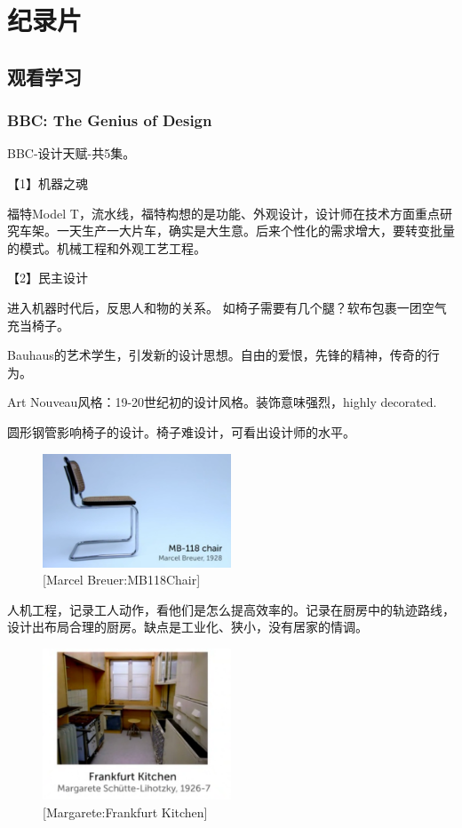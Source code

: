 \documentclass[UTF8]{../RepresentationUniverse}
\begin{document}
\section{纪录片}

\subsection{观看学习}


\subsubsection{BBC: The Genius of Design}
BBC-设计天赋-共5集。

【1】机器之魂

福特Model T，流水线，福特构想的是功能、外观设计，设计师在技术方面重点研究车架。一天生产一大片车，确实是大生意。后来个性化的需求增大，要转变批量的模式。机械工程和外观工艺工程。



【2】民主设计

进入机器时代后，反思人和物的关系。
如椅子需要有几个腿？软布包裹一团空气充当椅子。

Bauhaus的艺术学生，引发新的设计思想。自由的爱恨，先锋的精神，传奇的行为。

Art Nouveau风格：19-20世纪初的设计风格。装饰意味强烈，highly decorated.

圆形钢管影响椅子的设计。椅子难设计，可看出设计师的水平。



\begin{figure}[h]
    \centering
    \includegraphics[width=0.5\textwidth]{./src/figures/MB118Chair_2023-04-09_16-42-08.png}
    \caption{[Marcel Breuer:MB118Chair]}
    \label{figure:MB118Chair}
\end{figure}


人机工程，记录工人动作，看他们是怎么提高效率的。记录在厨房中的轨迹路线，设计出布局合理的厨房。缺点是工业化、狭小，没有居家的情调。

\begin{figure}[h]
    \centering
    \includegraphics[width=0.5\textwidth]{./src/figures/Frankfurt Kitchen_2023-04-09_16-48-37.png}
    \caption{[Margarete:Frankfurt Kitchen]}
    \label{figure:Frankfurt Kitchen}
\end{figure}
\end{document}
